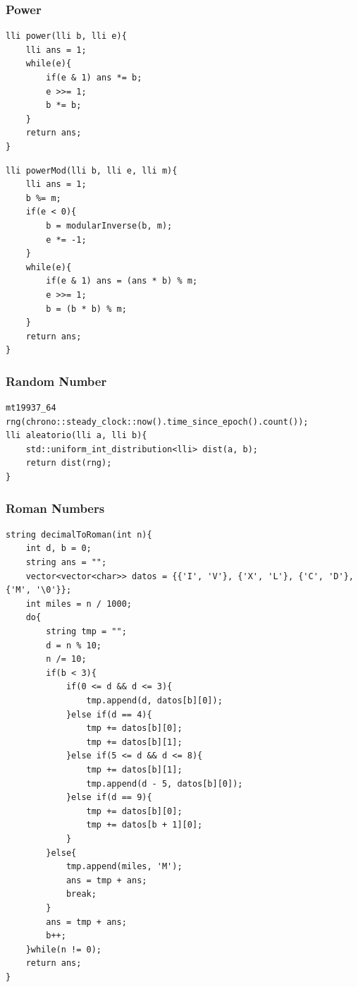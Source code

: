 \documentclass[twoside]{article}
\begin{document}
\begin{multicols*}{2}
\begin{verbatim}
\end{verbatim}

\subsubsectionfont{\large\bfseries\sffamily\underline}
\subsubsection*{Power}
\begin{verbatim}
lli power(lli b, lli e){
	lli ans = 1;
	while(e){
		if(e & 1) ans *= b;
		e >>= 1;
		b *= b;
	}
	return ans;
}

\end{verbatim}
\vspace{-12pt}
\begin{verbatim}
lli powerMod(lli b, lli e, lli m){
	lli ans = 1;
	b %= m;
	if(e < 0){
		b = modularInverse(b, m);
		e *= -1;
	}
	while(e){
		if(e & 1) ans = (ans * b) % m;
		e >>= 1;
		b = (b * b) % m;
	}
	return ans;
}

\end{verbatim}

\subsubsectionfont{\large\bfseries\sffamily\underline}
\subsubsection*{Random Number}
\begin{verbatim}
mt19937_64 rng(chrono::steady_clock::now().time_since_epoch().count());
lli aleatorio(lli a, lli b){
	std::uniform_int_distribution<lli> dist(a, b);
	return dist(rng);
}

\end{verbatim}

\subsubsectionfont{\large\bfseries\sffamily\underline}
\subsubsection*{Roman Numbers}
\begin{verbatim}
string decimalToRoman(int n){
	int d, b = 0;
	string ans = "";
	vector<vector<char>> datos = {{'I', 'V'}, {'X', 'L'}, {'C', 'D'}, {'M', '\0'}};
	int miles = n / 1000;
	do{
		string tmp = "";
		d = n % 10;
		n /= 10;
		if(b < 3){
			if(0 <= d && d <= 3){
				tmp.append(d, datos[b][0]);
			}else if(d == 4){
				tmp += datos[b][0];
				tmp += datos[b][1];
			}else if(5 <= d && d <= 8){
				tmp += datos[b][1];
				tmp.append(d - 5, datos[b][0]);
			}else if(d == 9){
				tmp += datos[b][0];
				tmp += datos[b + 1][0];
			}
		}else{
			tmp.append(miles, 'M');
			ans = tmp + ans;
			break;
		}
		ans = tmp + ans;
		b++;
	}while(n != 0);
	return ans;
}


\end{verbatim}
\end{multicols*}
\end{document}
